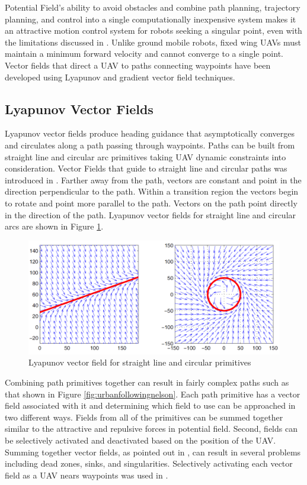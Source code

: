 \documentclass[numbered,pdftex]{ohio-etd}
\begin{document}
Potential Field's ability to avoid obstacles and combine path planning, trajectory planning, and control into a single computationally inexpensive system makes it an attractive motion control system for robots seeking a singular point, even with the limitations discussed in \cite{koren_potential_1991}. Unlike ground mobile robots, fixed wing UAVs must maintain a minimum forward velocity and cannot converge to a single point. Vector fields that direct a UAV to paths connecting waypoints have been developed using Lyapunov and gradient vector field techniques. 
 
 
\subsection{Lyapunov Vector Fields}
Lyapunov vector fields produce heading guidance that asymptotically converges and circulates along a path passing through waypoints. Paths can be built from straight line and circular arc primitives taking UAV dynamic constraints into consideration. Vector Fields that guide to straight line and circular paths was introduced in \cite{nelson_cooperative_2005}. Farther away from the path, vectors are constant and point in the direction perpendicular to the path. Within a transition region the vectors begin to rotate and point more parallel to the path. Vectors on the path point directly in the direction of the path. Lyapunov vector fields for straight line and circular arcs are shown in Figure \ref{fig:nelsonlyapunov}.
\begin{figure}
	\centering
	\includegraphics[width=13cm]{PaperFigures/nelsonLyapunov}
	\caption{Lyapunov vector field for straight line and circular primitives \cite{nelson_cooperative_2005}}
	\label{fig:nelsonlyapunov}
\end{figure}

Combining path primitives together can result in fairly complex paths such as that shown in Figure \ref{fig:urbanfollowingnelson}. Each path primitive has a vector field associated with it and determining which field to use can be approached in two different ways. Fields from all of the primitives can be summed together similar to the attractive and repulsive forces in potential field. Second, fields can be selectively activated and deactivated based on the position of the UAV. Summing together vector fields, as pointed out in \cite{nelson_cooperative_2005}, can result in several problems including dead zones, sinks, and singularities. Selectively activating each vector field as a UAV nears waypoints was used in \cite{nelson_cooperative_2005,nelson_vector_2006,nelson_vector_2007}.
\end{document}
